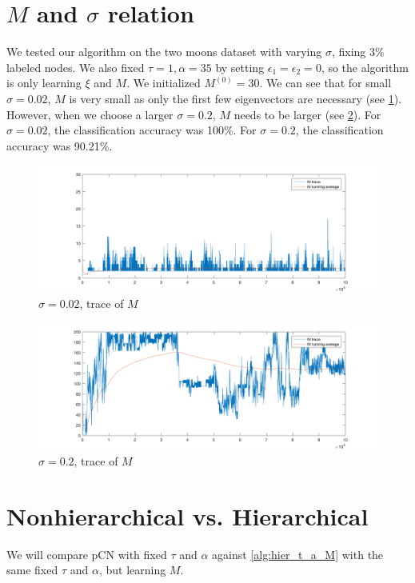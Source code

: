 \documentclass{siamart1116}
\begin{document}
\section{$M$ and $\sigma$ relation}
We tested our algorithm on the two moons dataset with varying $\sigma$, fixing $3\%$ labeled nodes. We also fixed $\tau=1,\alpha=35$ by setting $\epsilon_1=\epsilon_2=0$, so the algorithm is only learning $\xi$ and $M$. We initialized $M^{(0)} = 30$. We can see that for small $\sigma = 0.02$, $M$ is very small as only the first few eigenvectors are necessary (see \cref{fig:learnM_sigma_0.02}). However, when we choose a larger $\sigma = 0.2$, $M$ needs to be larger (see \cref{fig:learnM_sigma_0.20}). For $\sigma = 0.02$, the classification accuracy was 100\%. For $\sigma = 0.2$, the classification accuracy was 90.21\%.

\begin{figure}[!htb]
\caption{\label{fig:learnM_sigma_0.02} $\sigma=0.02$, trace of $M$}
\includegraphics[width=\linewidth]{old/sigma_0_02/M_trace.png}
\end{figure}
\begin{figure}[!htb]
\caption{\label{fig:learnM_sigma_0.20} $\sigma=0.2$, trace of $M$}
\includegraphics[width=\linewidth]{old/sigma_0_20/M_trace.png}
\end{figure}

\section{Nonhierarchical vs. Hierarchical}
We will compare pCN with fixed $\tau$ and $\alpha$ against \cref{alg:hier_t_a_M} with the same fixed $\tau$ and $\alpha$, but learning $M$.
\end{document}
